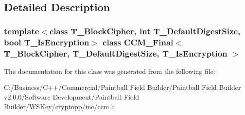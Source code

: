 \subsection{Detailed Description}
\subsubsection*{template$<$class T\_\-BlockCipher, int T\_\-DefaultDigestSize, bool T\_\-IsEncryption$>$ class CCM\_\-Final$<$ T\_\-BlockCipher, T\_\-DefaultDigestSize, T\_\-IsEncryption $>$}



The documentation for this class was generated from the following file:\begin{DoxyCompactItemize}
\item 
C:/Business/C++/Commercial/Paintball Field Builder/Paintball Field Builder v2.0.0/Software Development/Paintball Field Builder/WSKey/cryptopp/inc/ccm.h\end{DoxyCompactItemize}

